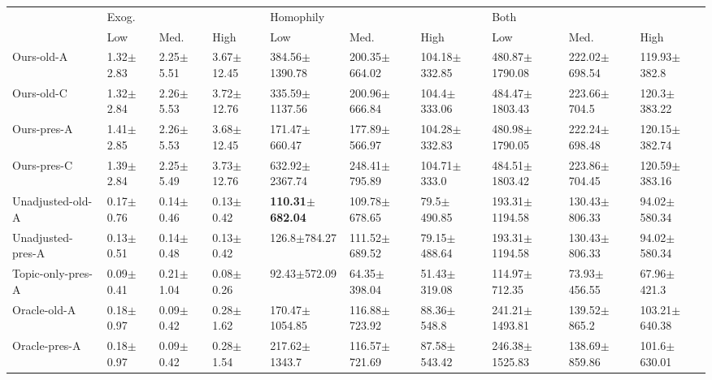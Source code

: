 \begin{tabular}{llllllllll}
\toprule
{} & \multicolumn{3}{l}{Exog.} & \multicolumn{3}{l}{Homophily} & \multicolumn{3}{l}{Both} \\
{} &            Low &           Med. &            High &                         Low &                  Med. &                  High &                 Low &                Med. &               High \\
\midrule
Ours-old-A          &  1.32$\pm$2.83 &  2.25$\pm$5.51 &  3.67$\pm$12.45 &          384.56$\pm$1390.78 &     200.35$\pm$664.02 &     104.18$\pm$332.85 &  480.87$\pm$1790.08 &   222.02$\pm$698.54 &   119.93$\pm$382.8 \\
Ours-old-C          &  1.32$\pm$2.84 &  2.26$\pm$5.53 &  3.72$\pm$12.76 &          335.59$\pm$1137.56 &     200.96$\pm$666.84 &      104.4$\pm$333.06 &  484.47$\pm$1803.43 &    223.66$\pm$704.5 &   120.3$\pm$383.22 \\
Ours-pres-A         &  1.41$\pm$2.85 &  2.26$\pm$5.53 &  3.68$\pm$12.45 &           171.47$\pm$660.47 &     177.89$\pm$566.97 &     104.28$\pm$332.83 &  480.98$\pm$1790.05 &   222.24$\pm$698.48 &  120.15$\pm$382.74 \\
Ours-pres-C         &  1.39$\pm$2.84 &  2.25$\pm$5.49 &  3.73$\pm$12.76 &          632.92$\pm$2367.74 &     248.41$\pm$795.89 &      104.71$\pm$333.0 &  484.51$\pm$1803.42 &   223.86$\pm$704.45 &  120.59$\pm$383.16 \\
Unadjusted-old-A    &  0.17$\pm$0.76 &  0.14$\pm$0.46 &   0.13$\pm$0.42 &  \textbf{110.31$\pm$682.04} &     109.78$\pm$678.65 &       79.5$\pm$490.85 &  193.31$\pm$1194.58 &   130.43$\pm$806.33 &   94.02$\pm$580.34 \\
Unadjusted-pres-A   &  0.13$\pm$0.51 &  0.14$\pm$0.48 &   0.13$\pm$0.42 &            126.8$\pm$784.27 &     111.52$\pm$689.52 &      79.15$\pm$488.64 &  193.31$\pm$1194.58 &   130.43$\pm$806.33 &   94.02$\pm$580.34 \\
Topic-only-pres-A   &  0.09$\pm$0.41 &  0.21$\pm$1.04 &   0.08$\pm$0.26 &            92.43$\pm$572.09 &      64.35$\pm$398.04 &      51.43$\pm$319.08 &   114.97$\pm$712.35 &    73.93$\pm$456.55 &    67.96$\pm$421.3 \\
Oracle-old-A        &  0.18$\pm$0.97 &  0.09$\pm$0.42 &   0.28$\pm$1.62 &          170.47$\pm$1054.85 &     116.88$\pm$723.92 &       88.36$\pm$548.8 &  241.21$\pm$1493.81 &    139.52$\pm$865.2 &  103.21$\pm$640.38 \\
Oracle-pres-A       &  0.18$\pm$0.97 &  0.09$\pm$0.42 &   0.28$\pm$1.54 &           217.62$\pm$1343.7 &     116.57$\pm$721.69 &      87.58$\pm$543.42 &  246.38$\pm$1525.83 &   138.69$\pm$859.86 &   101.6$\pm$630.01 \\

\end{tabular}
